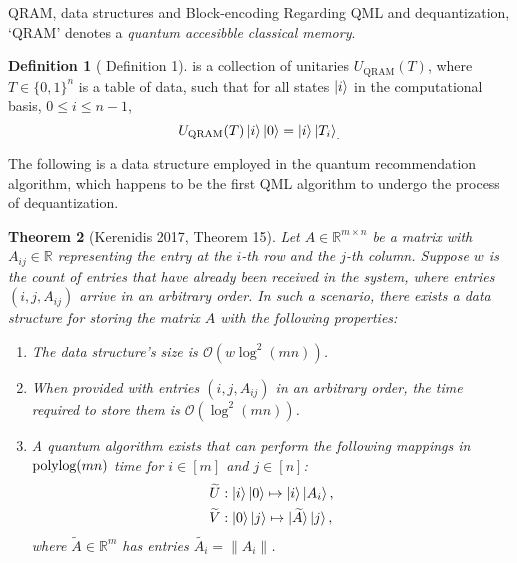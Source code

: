 \documentclass[10pt,twoside,reqno]{amsart} %
\makeatletter
\renewcommand{\section}{\@startsection{section}{1}
   \z@{.7\linespacing\@plus\linespacing}{.5\linespacing}
   {\normalfont\upshape\bfseries\centering}}
\theoremstyle{plain}
\newtheorem{thm}{Theorem}[section]
\theoremstyle{definition}
\newtheorem{defn}[thm]{Definition}
\makeatother
\begin{document}
\section{QRAM, data structures and Block-encoding}
Regarding QML and dequantization, `QRAM' denotes a \emph{quantum accesibble
classical memory}.
\begin{defn}[\cite{jaques2023} Definition 1]
  is a collection of unitaries $U_{\textrm{QRAM}}(T)$, where 
  $T\in\{0,1\}^n$ is a table of data, such that for all states $\ket{i}$
  in the computational basis, $0\leq i\leq n-1$,
  \[
    U_{\textrm{QRAM}}(T)\ket{i}\ket0=\ket{i}\ket{T_i}_.
  \]
\end{defn}
The following is a data structure employed in the quantum recommendation 
algorithm, which happens to be the first QML algorithm to undergo the 
process of dequantization.
\begin{thm}[Kerenidis 2017, Theorem 15]
  Let $A \in \mathbb{R}^{m \times n}$ be a matrix with $A_{ij} \in \mathbb{R}$ representing
  the entry at the $i$-th row and the $j$-th column. Suppose $w$ is the count of entries that
  have already been received in the system, where entries $(i, j, A_{ij})$ arrive in an arbitrary order.
  In such a scenario, there exists a data structure for storing the matrix $A$ with the following properties:

  \begin{enumerate}
    \item The data structure's size is $\mathcal{O}(w \log^2(mn))$.
    \item When provided with entries $(i, j, A_{ij})$ in an arbitrary order, the time required to store them
       is $\mathcal{O}(\log^2(mn))$.
    \item A quantum algorithm exists that can perform the following mappings in $\textrm{\normalfont polylog}(mn)$ time
       for $i \in [m]$ and $j \in [n]$:
       \begin{align*}
        \widetilde{U} & : \ket{i}\ket{0} \mapsto \ket{i}\ket{A_i},\\
        \widetilde{V} & : \ket{0}\ket{j} \mapsto \ket{\widetilde{A}}\ket{j},
       \end{align*}
       where $\widetilde{A} \in \mathbb{R}^m$ has entries $\widetilde{A_i} = \|A_i\|$.
  \end{enumerate}
\end{thm}
\end{document}
